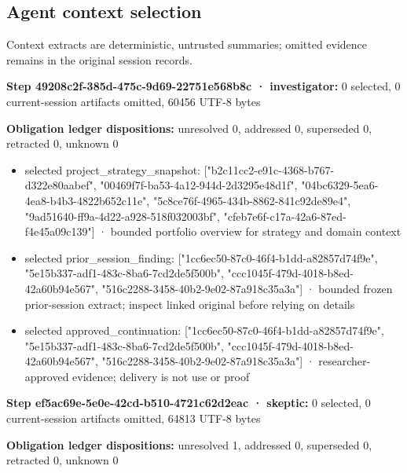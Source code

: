 \documentclass[11pt]{article}
\begin{document}
\subsection{Agent context selection}
Context extracts are deterministic, untrusted summaries; omitted evidence remains in the original session records.\par
\textbf{Step 49208c2f-385d-475c-9d69-22751e568b8c · investigator:} 0 selected, 0 current-session artifacts omitted, 60456 UTF-8 bytes\par
\textbf{Obligation ledger dispositions:} unresolved 0, addressed 0, superseded 0, retracted 0, unknown 0\par
\begin{itemize}
\item selected project\_strategy\_snapshot: ["b2c11cc2-e91c-4368-b767-d322e80aabef", "00469f7f-ba53-4a12-944d-2d3295e48d1f", "04bc6329-5ea6-4ea8-b4b3-4822b652c11e", "5c8ce76f-4965-434b-8862-841c92de89e4", "9ad51640-ff9a-4d22-a928-518f032003bf", "cfeb7e6f-c17a-42a6-87ed-f4e45a09c139"] · bounded portfolio overview for strategy and domain context
\item selected prior\_session\_finding: ["1cc6ec50-87c0-46f4-b1dd-a82857d74f9e", "5e15b337-adf1-483c-8ba6-7cd2de5f500b", "ccc1045f-479d-4018-b8ed-42a60b94e567", "516c2288-3458-40b2-9e02-87a918c35a3a"] · bounded frozen prior-session extract; inspect linked original before relying on details
\item selected approved\_continuation: ["1cc6ec50-87c0-46f4-b1dd-a82857d74f9e", "5e15b337-adf1-483c-8ba6-7cd2de5f500b", "ccc1045f-479d-4018-b8ed-42a60b94e567", "516c2288-3458-40b2-9e02-87a918c35a3a"] · researcher-approved evidence; delivery is not use or proof
\end{itemize}
\textbf{Step ef5ac69e-5e0e-42cd-b510-4721c62d2eac · skeptic:} 0 selected, 0 current-session artifacts omitted, 64813 UTF-8 bytes\par
\textbf{Obligation ledger dispositions:} unresolved 1, addressed 0, superseded 0, retracted 0, unknown 0\par
\end{document}
